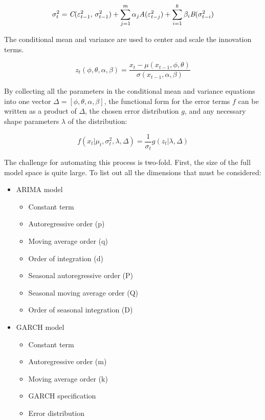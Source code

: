 \documentclass[12pt]{article}
\begin{document}
\begin{equation} \label{eq:conditional_var}
    \sigma^{2}_{t} = \emph{C}(\varepsilon^{2}_{t-1}, \, \sigma^{2}_{t-1}) + \sum_{j=1}^{m} \alpha_{j} \emph{A}(\varepsilon^{2}_{t - j}) + \sum_{i=1}^{k} \beta_{i} \emph{B}(\sigma^{2}_{t - i})
\end{equation}

The conditional mean and variance are used to center and scale the innovation terms.

\begin{equation}
    z_{t}(\phi, \theta, \alpha, \beta) = \frac{x_{t} - \mu(x_{t-1}, \phi, \theta)}{\sigma(x_{t-1}, \alpha, \beta)}
\end{equation}

By collecting all the parameters in the conditional mean and variance equations into one vector $\Delta = [\phi, \theta, \alpha, \beta]$, the functional form for the error terms $f$ can be written as a product of $\Delta$, the chosen error distribution $g$, and any necessary shape parameters $\lambda$ of the distribution:

\begin{equation} \label{eq:conditional_distr}
    f(x_{t} | \mu_{t}, \sigma^{2}_{t}, \lambda, \Delta) = \frac{1}{\sigma_{t}} g(z_{t} | \lambda, \Delta)
\end{equation}

The challenge for automating this process is two-fold. First, the size of the full model space is quite large. To list out all the dimensions that must be considered:

\begin{itemize}
    \item ARIMA model
        \begin{itemize}
            \item Constant term
            \item Autoregressive order (p)
            \item Moving average order (q)
            \item Order of integration (d)
            \item Seasonal autoregressive order (P)
            \item Seasonal moving average order (Q)
            \item Order of seasonal integration (D)
        \end{itemize}
        \item GARCH model
        \begin{itemize}
            \item Constant term
            \item Autoregressive order (m)
            \item Moving average order (k)
            \item GARCH specification
            \item Error distribution
        \end{itemize}

\end{itemize}
\end{document}
